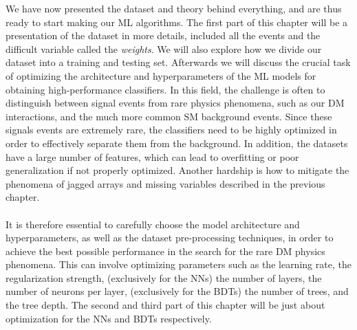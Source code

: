 \documentclass[14pt, a4paper]{book}
\begin{document}
\label{chap:Method_ML}
We have now presented the dataset and theory behind everything, and are thus ready to start making our ML algorithms. The first part of this chapter will be a presentation of the dataset in more details, included all the events and the difficult variable called the \textit{weights}.
We will also explore how we divide our dataset into a training and testing set. Afterwards we will discuss the crucial task of optimizing the architecture and hyperparameters of the ML models for obtaining high-performance classifiers. In this field, the challenge is often to 
distinguish between signal events from rare physics phenomena, such as our DM interactions, and the much more common SM background events. Since these signals events are extremely rare, the classifiers need to be highly optimized in order to effectively separate them from 
the background. In addition, the datasets have a large number of features, which can lead to overfitting or poor generalization if not properly optimized. Another hardship is how to mitigate the phenomena of jagged arrays and missing variables described in the previous chapter.\\
\\It is therefore essential to carefully choose the model architecture and hyperparameters, as well as the dataset pre-processing techniques, in order to achieve the best possible performance in the search for the rare DM physics phenomena. This can involve optimizing 
parameters such as the learning rate, the regularization strength, (exclusively for the NNs) the number of layers, the number of neurons per layer, (exclusively for the BDTs) the number of trees, and the tree depth. The second and third part of this chapter will be just about optimization for the NNs and BDTs respectively.

\clearpage
\end{document}
